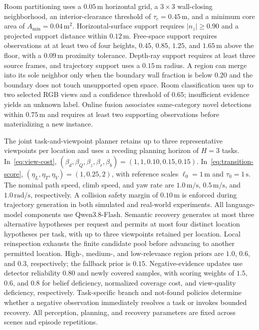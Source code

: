 \documentclass[letterpaper,10pt,journal]{IEEEtran}
\begin{document}
Room partitioning uses a $0.05\,\mathrm{m}$ horizontal grid, a $3\times3$ wall-closing neighborhood, an interior-clearance threshold of $\tau_c=0.45\,\mathrm{m}$, and a minimum core area of $A_{\min}=0.04\,\mathrm{m}^2$. Horizontal-surface support requires $|n_z|\geq0.90$ and a projected support distance within $0.12\,\mathrm{m}$. Free-space support requires observations at at least two of four heights, $0.45$, $0.85$, $1.25$, and $1.65\,\mathrm{m}$ above the floor, with a $0.09\,\mathrm{m}$ proximity tolerance. Depth-ray support requires at least three source frames, and trajectory support uses a $0.15\,\mathrm{m}$ radius. A region can merge into its sole neighbor only when the boundary wall fraction is below $0.20$ and the boundary does not touch unsupported open space. Room classification uses up to two selected RGB views and a confidence threshold of $0.65$; insufficient evidence yields an unknown label. Online fusion associates same-category novel detections within $0.75\,\mathrm{m}$ and requires at least two supporting observations before materializing a new instance.

The joint task-and-viewpoint planner retains up to three representative viewpoints per location and uses a receding planning horizon of $H=3$ tasks. In~\eqref{eq:view-cost}, $(\beta_d,\beta_Q,\beta_z,\beta_r,\beta_b)=(1,1,0.10,0.15,0.15)$. In~\eqref{eq:transition-score}, $(\eta_L,\eta_T,\eta_V)=(1,0.25,2)$, with reference scales $\ell_0=1\,\mathrm{m}$ and $\tau_0=1\,\mathrm{s}$. The nominal path speed, climb speed, and yaw rate are $1.0\,\mathrm{m/s}$, $0.5\,\mathrm{m/s}$, and $1.0\,\mathrm{rad/s}$, respectively. A collision safety margin of $0.10\,\mathrm{m}$ is enforced during trajectory generation in both simulated and real-world experiments. All language-model components use Qwen3.8-Flash. Semantic recovery generates at most three alternative hypotheses per request and permits at most four distinct location hypotheses per task, with up to three viewpoints retained per location. Local reinspection exhausts the finite candidate pool before advancing to another permitted location. High-, medium-, and low-relevance region priors are $1.0$, $0.6$, and $0.3$, respectively; the fallback prior is $0.15$. Negative-evidence updates use detector reliability $0.80$ and newly covered samples, with scoring weights of $1.5$, $0.6$, and $0.8$ for belief deficiency, normalized coverage cost, and view-quality deficiency, respectively. Task-specific branch and not-found policies determine whether a negative observation immediately resolves a task or invokes bounded recovery. All perception, planning, and recovery parameters are fixed across scenes and episode repetitions.
\end{document}
